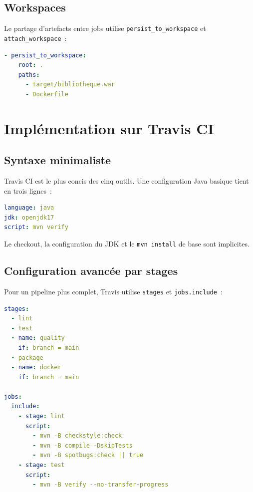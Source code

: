\documentclass[12pt,a4paper]{report}
\begin{document}
\section{Workspaces}

Le partage d'artefacts entre jobs utilise \texttt{persist\_to\_workspace} et
\texttt{attach\_workspace}~:

\begin{lstlisting}[language=YAML, caption={Workspace CircleCI}]
- persist_to_workspace:
    root: .
    paths:
      - target/bibliotheque.war
      - Dockerfile
\end{lstlisting}

\chapter{Implémentation sur Travis CI}
\label{ch:travis}

\section{Syntaxe minimaliste}

Travis CI est le plus concis des cinq outils. Une configuration Java basique
tient en trois lignes~:

\begin{lstlisting}[language=YAML, caption={Configuration Travis minimale}]
language: java
jdk: openjdk17
script: mvn verify
\end{lstlisting}

Le checkout, la configuration du JDK et le \texttt{mvn install} de base sont
implicites.

\section{Configuration avancée par stages}

Pour un pipeline plus complet, Travis utilise \texttt{stages} et \texttt{jobs.include}~:

\begin{lstlisting}[language=YAML, caption={Stages Travis}]
stages:
  - lint
  - test
  - name: quality
    if: branch = main
  - package
  - name: docker
    if: branch = main

jobs:
  include:
    - stage: lint
      script:
        - mvn -B checkstyle:check
        - mvn -B compile -DskipTests
        - mvn -B spotbugs:check || true
    - stage: test
      script:
        - mvn -B verify --no-transfer-progress
\end{lstlisting}
\end{document}
